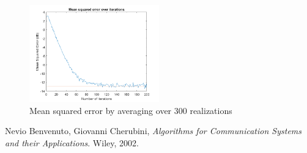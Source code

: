 \documentclass[a4paper, 12pt]{report}
\begin{document}

\begin{figure}[H]
	\centering
	\includegraphics[width=0.5\textwidth]{error_300real}
	\caption{Mean squared error by averaging over 300 realizations}
	\label{fig:err300}
\end{figure}

\begin{thebibliography}{15}
	Nevio Benvenuto, Giovanni Cherubini,
	\textit{Algorithms for Communication Systems and their Applications}. 
	Wiley, 2002.
\end{thebibliography}
\end{document}
